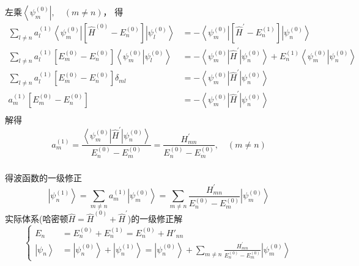 \begin{frame}
  \frametitle{}
左乘$\left\langle \psi_m^{(0)} \right|, \quad (m \ne n)$， 得
\begin{equation*}
  \begin{aligned}
    \sum_{l\ne n} a_l^{(1)}\left\langle \psi_m^{(0)} \right|\left[\hat{H}^{(0)}-E_n^{(0)}\right] \left|\psi_l^{(0)}\right\rangle   &= -\left\langle \psi_m^{(0)} \right|\left[\hat{H}^{\prime}-E_n^{(1)}\right]\left| \psi_n^{(0)}\right\rangle  \\
    \sum_{l\ne n} a_l^{(1)}\left[E_m^{(0)}-E_n^{(0)}\right]\left\langle \psi_m^{(0)} \left|\psi_l^{(0)}\right\rangle \right.   &= -\left\langle \psi_m^{(0)} \right|\hat{H}^{\prime}\left| \psi_n^{(0)}\right\rangle + E_n^{(1)}\left\langle \psi_m^{(0)} \left| \psi_n^{(0)}\right\rangle\right. \\ 
    \sum_{l\ne n} a_l^{(1)}\left[E_m^{(0)}-E_n^{(0)}\right] \delta _{ml}   &= -\left\langle \psi_m^{(0)} \right|\hat{H}^{\prime}\left| \psi_n^{(0)}\right\rangle \\ 
    a_m^{(1)}\left[E_m^{(0)}-E_n^{(0)}\right] &= -\left\langle \psi_m^{(0)} \right|\hat{H}^{\prime}\left| \psi_n^{(0)}\right\rangle \\ 
  \end{aligned}
 \end{equation*}
 解得
 \[ a_m^{(1)} = \frac{\left\langle \psi_m^{(0)} \right|\hat{H}^{\prime}\left| \psi_n^{(0)}\right\rangle}{E_n^{(0)}-E_m^{(0)}} = \frac{{H}^{\prime}_{mn}}{E_n^{(0)}-E_m^{(0)}}, \quad (m \ne n) \]
\end{frame} 

\begin{frame}
  \frametitle{}
得波函数的一级修正
\[ \left|\psi_n^{(1)}\right\rangle =\sum_{m\ne n} a_m^{(1)} \left|\psi_m^{(0)}\right\rangle  
= \sum_{m\ne n} \frac{H^{\prime}_{mn}}{E_n^{(0)}-E_m^{(0)}} \left|\psi_m^{(0)}\right\rangle \]
实际体系(哈密顿$\hat{H} = \hat{H}^{(0)} + \hat{H}^{'} $)的一级修正解
\begin{equation*}
  \boxed{\left\{\begin{aligned}
    E_n &= E_n^{(0)} + E_n^{(1)} = E_n^{(0)} + H'_{nn} \\
    \left|\psi_n \right\rangle &= \left|\psi_n^{(0)}\right\rangle +\left|\psi_n^{(1)}\right\rangle = \left|\psi_n^{(0)}\right\rangle + \sum_{m\ne n} \frac{H^{\prime}_{mn}}{E_n^{(0)}-E_m^{(0)}} \left|\psi_m^{(0)}\right\rangle 
  \end{aligned} \right.}
\end{equation*}    
\end{frame} 

